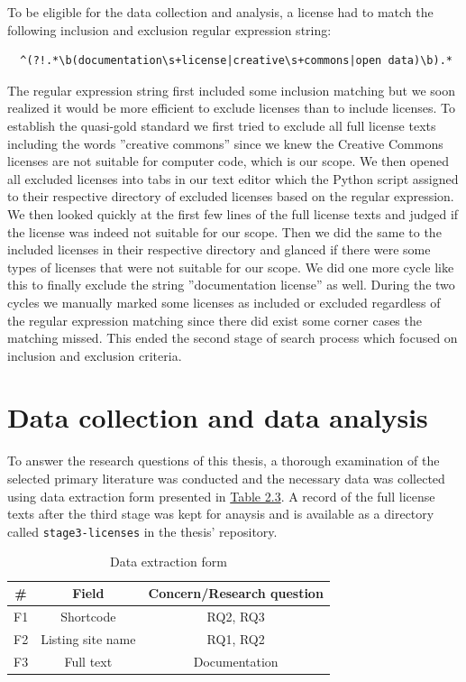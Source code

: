 To be eligible for the data collection and analysis, a license had to match the following inclusion and exclusion regular expression string:
\begin{verbatim}
  ^(?!.*\b(documentation\s+license|creative\s+commons|open data)\b).*
\end{verbatim}

The regular expression string first included some inclusion matching but we soon realized it would be more efficient to exclude licenses than to include licenses. To establish the quasi-gold standard we first tried to exclude all full license texts including the words ''creative commons'' since we knew the Creative Commons licenses are not suitable for computer code, which is our scope. We then opened all excluded licenses into tabs in our text editor which the Python script assigned to their respective directory of excluded licenses based on the regular expression. We then looked quickly at the first few lines of the full license texts and judged if the license was indeed not suitable for our scope. Then we did the same to the included licenses in their respective directory and glanced if there were some types of licenses that were not suitable for our scope. We did one more cycle like this to finally exclude the string ''documentation license'' as well. During the two cycles we manually marked some licenses as included or excluded regardless of the regular expression matching since there did exist some corner cases the matching missed. This ended the second stage of search process which focused on inclusion and exclusion criteria.

\section{Data collection and data analysis}
To answer the research questions of this thesis, a thorough examination of the selected primary literature was conducted and the necessary data was collected using data extraction form presented in \hyperref[table:extraction]{Table 2.3}. A record of the full license texts after the third stage was kept for anaysis and is available as a directory called \texttt{stage3-licenses} in the thesis' repository\footnotemark[1].

\begin{table}[t]
  \caption{Data extraction form}
	\begin{center}
		\begin{tabular}{||c c c||} 
			\hline
			\# & Field & Concern/Research question \\
			\hline
			F1 & Shortcode & RQ2, RQ3 \\
			F2 & Listing site name & RQ1, RQ2 \\
			F3 & Full text &  Documentation\\
			\hline
		\end{tabular}
		\label{table:extraction}
	\end{center}
\end{table}

